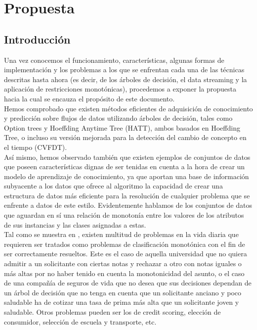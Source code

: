 \chapter[Capítulo 4. Propuesta]{Propuesta}

\section{Introducción}

Una vez conocemos el funcionamiento, características, algunas formas de implementación y los problemas a los que se enfrentan cada una de las técnicas descritas hasta ahora (es decir, de los árboles de decisión, el data streaming y la aplicación de restricciones monotónicas), procedemos a exponer la propuesta hacia la cual se encauza el propósito de este documento.\\

Hemos comprobado que existen métodos eficientes de adquisición de conocimiento y predicción sobre flujos de datos utilizando árboles de decisión, tales como Option trees y Hoeffding Anytime Tree (HATT), ambos basados en Hoeffding Tree, o incluso su versión mejorada para la detección del cambio de concepto en el tiempo (CVFDT).\\

Así mismo, hemos observado también que existen ejemplos de conjuntos de datos que poseen características dignas de ser tenidas en cuenta a la hora de crear un modelo de aprendizaje de conocimiento, ya que aportan una base de información subyacente a los datos que ofrece al algoritmo la capacidad de crear una estructura de datos más eficiente para la resolución de cualquier problema que se enfrente a datos de este estilo. Evidentemente hablamos de los conjuntos de datos que aguardan en sí una relación de monotonía entre los valores de los atributos de sus instancias y las clases asignadas a estas.\\

Tal como se muestra en \cite{ref14}, existen multitud de problemas en la vida diaria que requieren ser tratados como problemas de clasificación monotónica con el fin de ser correctamente resueltos. Este es el caso de aquella universidad que no quiera admitir a un solicitante con ciertas notas y rechazar a otro con notas iguales o más altas por no haber tenido en cuenta la monotonicidad del asunto, o el caso de una compañía de seguros de vida que no desea que sus decisiones dependan de un árbol de decisión que no tenga en cuenta que un solicitante anciano y poco saludable ha de cotizar una tasa de prima más alta que un solicitante joven y saludable. Otros problemas pueden ser los de credit scoring, elección de consumidor, selección de escuela y transporte, etc.\\

